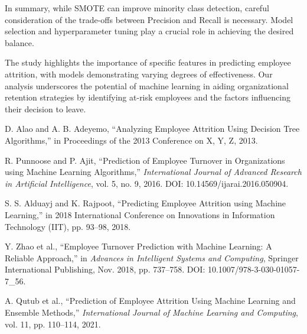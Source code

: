 \documentclass[12pt, twocolumn]{article}
\begin{document}
	In summary, while SMOTE can improve minority class detection, careful consideration of the trade-offs between Precision and Recall is necessary. Model selection and hyperparameter tuning play a crucial role in achieving the desired balance.
	
	The study highlights the importance of specific features in predicting employee attrition, with models demonstrating varying degrees of effectiveness. Our analysis underscores the potential of machine learning in aiding organizational retention strategies by identifying at-risk employees and the factors influencing their decision to leave.
	
	\clearpage
	
	\begin{thebibliography}{99}
		
		D. Alao and A. B. Adeyemo, “Analyzing Employee Attrition Using Decision Tree Algorithms,” in Proceedings of the 2013 Conference on X, Y, Z, 2013.
		
		R. Punnoose and P. Ajit, “Prediction of Employee Turnover in Organizations using Machine Learning Algorithms,” \textit{International Journal of Advanced Research in Artificial Intelligence}, vol. 5, no. 9, 2016. DOI: 10.14569/ijarai.2016.050904.
		
		S. S. Alduayj and K. Rajpoot, “Predicting Employee Attrition using Machine Learning,” in 2018 International Conference on Innovations in Information Technology (IIT), pp. 93–98, 2018.
		
		Y. Zhao et al., “Employee Turnover Prediction with Machine Learning: A Reliable Approach,” in \textit{Advances in Intelligent Systems and Computing}, Springer International Publishing, Nov. 2018, pp. 737–758. DOI: 10.1007/978-3-030-01057-7\_56.
		
		A. Qutub et al., “Prediction of Employee Attrition Using Machine Learning and Ensemble Methods,” \textit{International Journal of Machine Learning and Computing}, vol. 11, pp. 110–114, 2021.
		
	\end{thebibliography}
	
\end{document}
